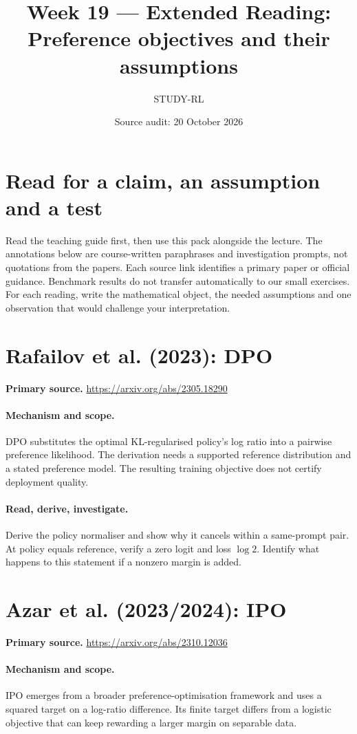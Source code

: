 \documentclass[11pt]{scrartcl}
\title{Week 19 --- Extended Reading: Preference objectives and their assumptions}
\author{STUDY-RL}
\date{Source audit: 20 October 2026}
\begin{document}
\maketitle
\section*{Read for a claim, an assumption and a test}
Read the teaching guide first, then use this pack alongside the lecture.
The annotations below are course-written paraphrases and investigation prompts,
not quotations from the papers. Each source link identifies a primary paper
or official guidance. Benchmark results do not transfer automatically to our
small exercises. For each reading, write the mathematical object, the needed
assumptions and one observation that would challenge your interpretation.

\section{Rafailov et al. (2023): DPO}
\noindent\textbf{Primary source.} \url{https://arxiv.org/abs/2305.18290}

\paragraph{Mechanism and scope.} DPO substitutes the optimal KL-regularised policy's log ratio into a pairwise preference likelihood. The derivation needs a supported reference distribution and a stated preference model. The resulting training objective does not certify deployment quality.

\paragraph{Read, derive, investigate.} Derive the policy normaliser and show why it cancels within a same-prompt pair. At policy equals reference, verify a zero logit and loss $\log2$. Identify what happens to this statement if a nonzero margin is added.

\section{Azar et al. (2023/2024): IPO}
\noindent\textbf{Primary source.} \url{https://arxiv.org/abs/2310.12036}

\paragraph{Mechanism and scope.} IPO emerges from a broader preference-optimisation framework and uses a squared target on a log-ratio difference. Its finite target differs from a logistic objective that can keep rewarding a larger margin on separable data.
\end{document}
